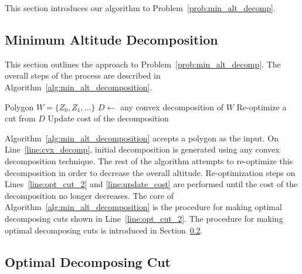 \documentclass[../main.tex]{subfiles}
\begin{document}
This section introduces our algorithm to Problem~\ref{prob:min_alt_decomp}.


\subsection{Minimum Altitude Decomposition}

This section outlines the approach to Problem~\ref{prob:min_alt_decomp}. The overall steps of the process are described in Algorithm~\ref{alg:min_alt_decomposition}.
\begin{algorithm}
	\caption{$\operatorname{min\_alt\_decomposition}(W)$}
	\label{alg:min_alt_decomposition}
	\begin{algorithmic}[1]
		\REQUIRE Polygon $W=\{Z_0,Z_1,\ldots\}$
			\STATE $D\gets$ any convex decomposition of $W$	\label{line:cvx_decomp}
			\REPEAT
				\STATE Re-optimize a cut from $D$ \label{line:opt_cut_2}
				\STATE Update cost of the decomposition \label{line:update_cost}
	\end{algorithmic}
\end{algorithm}

Algorithm~\ref{alg:min_alt_decomposition} accepts a polygon as the input. On Line~\ref{line:cvx_decomp}, initial decomposition is generated using any convex decomposition technique. The rest of the algorithm attempts to re-optimize this decomposition in order to decrease the overall altitude. Re-optimization steps on Lines~\ref{line:opt_cut_2} and \ref{line:update_cost} are performed until the cost of the decomposition no longer decreases. The core of Algorithm~\ref{alg:min_alt_decomposition} is the procedure for making optimal decomposing cuts shown in Line~\ref{line:opt_cut_2}. The procedure for making optimal decomposing cuts is introduced in Section~\ref{sec:alt_cut_decomposition}.


\subsection{Optimal Decomposing Cut}
\label{sec:alt_cut_decomposition}
\end{document}
